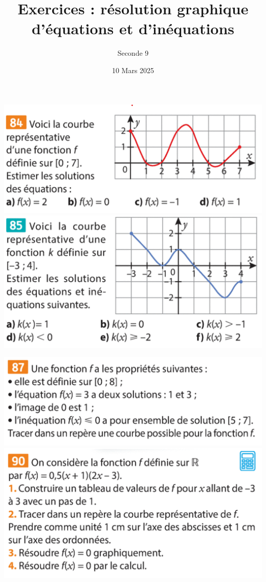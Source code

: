 \documentclass{article}
\title{Exercices : résolution graphique d'équations et d'inéquations}
\author{Seconde 9}
\date{10 Mars 2025}
\begin{document}
\maketitle

\begin{minipage}{0.45\textwidth}
\begin{center}
\includegraphics[width=\textwidth]{Exercice_1.png}
\includegraphics[width=\textwidth]{Exercice_2.png}
\end{center}    
\end{minipage}
\hfill\vline\hfill
\begin{minipage}{0.45\textwidth}
\begin{center}
\includegraphics[width=\textwidth]{Exercice_3.png}
\includegraphics[width=\textwidth]{Exercice_4.png}
\end{center}
\end{minipage}
\end{document}
